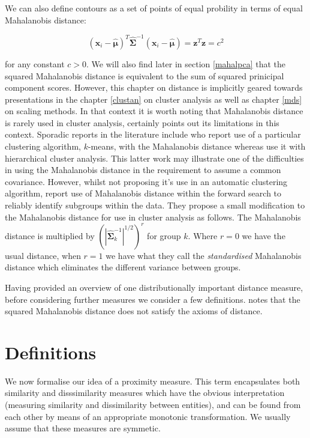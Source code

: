 We can also define contours as a set of points of equal probility in terms of equal Mahalanobis distance:

\begin{equation}
(\boldsymbol{x}_{i} - \hat{\boldsymbol{\mu}})^{T}
\hat{\boldsymbol{\Sigma}}^{-1}
(\boldsymbol{x}_{i} - \hat{\boldsymbol{\mu}}) = \boldsymbol{z}^{T}\boldsymbol{z} = c^{2}
\end{equation}

for any constant $c > 0$.  We will also find later in section \ref{mahalpca} that the squared Mahalanobis distance is equivalent to the sum of squared prinicipal component scores.   However, this chapter on distance is implicitly geared towards presentations in the chapter \ref{clustan} on cluster analysis as well as  chapter \ref{mds} on scaling methods.   In that context it is worth noting that Mahalanobis distance is rarely used in cluster analysis, certainly \cite{Kendall:1975} points out its limitations in this context.  Sporadic reports in the literature include \cite{Maronna+Jacovkis:1974} who report use of a particular clustering algorithm, $k$-means, with the Mahalanobis distance whereas \cite{Gnanadesikan+etal:1993} use it with hierarchical cluster analysis.   This latter work may illustrate one of the difficulties in using the Mahalanobis distance in the requirement to assume a common covariance.     However, whilst not proposing it's use in an automatic clustering algorithm, \cite{Atkinson+etal:2004} report use of Mahalanobis distance within the forward search to reliably identify subgroups within the data.   They propose a small modification to the Mahalanobis distance for use in cluster analysis as follows.   The Mahalanobis distance is multiplied by $(|\hat{\boldsymbol{\Sigma}}^{-1}_{k}|^{1/2})^{r}$ for group $k$.   Where $r=0$ we have the usual distance, when $r=1$ we have what they call the \emph{standardised} Mahalanobis distance which eliminates the different variance between groups.

Having provided an overview of one distributionally important distance measure, before considering further measures we consider a few definitions.   \cite{Flury:1997} notes that the squared Mahalanobis distance does not satisfy the axioms of distance.

\section{Definitions}
\label{distdefinitions}

We now formalise our idea of a proximity measure.  This term encapsulates both similarity and disssimilarity measures which have the obvious interpretation (measuring similarity and dissimilarity between entities), and can be found from each other by means of an appropriate monotonic transformation.   We usually assume that these measures are symmetic.

